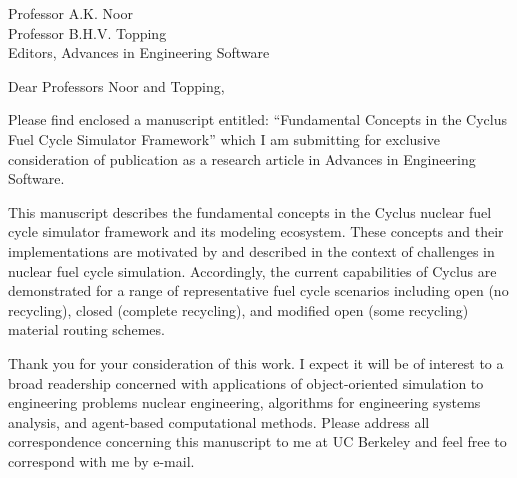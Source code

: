 \documentclass[11pt]{letter} %
\begin{document}


\begin{letter}{Professor A.K. Noor\\
Professor B.H.V. Topping\\
Editors, Advances in Engineering Software}

\address{Kathryn D. Huff\\
2150 Shattuck Ave.\\
Suite 230\\
Berkeley, CA 94720}



\opening{Dear Professors Noor and Topping,}

Please find enclosed a manuscript entitled: ``Fundamental Concepts in the 
Cyclus Fuel Cycle Simulator Framework'' which I am submitting for exclusive 
consideration of publication as a research article in Advances in Engineering 
Software.

This manuscript describes the fundamental concepts in the Cyclus nuclear fuel 
cycle simulator framework and its modeling ecosystem. These concepts and their 
implementations are motivated by and described in the context of challenges in 
nuclear fuel cycle simulation. Accordingly, the current capabilities of Cyclus 
are demonstrated for a range of representative fuel cycle scenarios including 
open (no recycling), closed (complete recycling), and modified open (some 
recycling) material routing schemes.


Thank you for your consideration of this work. I expect it will be of interest
to a broad readership concerned with applications of object-oriented simulation 
to engineering problems nuclear engineering, algorithms for engineering systems 
analysis, and agent-based computational methods. Please address all 
correspondence concerning this manuscript to me at UC Berkeley and feel free to 
correspond with me by e-mail.


\end{letter}
\end{document}
